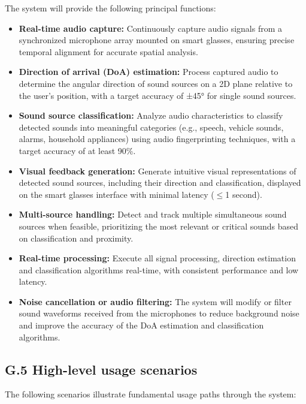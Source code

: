 \documentclass[12pt]{article}
\theoremstyle{definition}
\begin{document}
The system will provide the following principal functions:

\begin{itemize}
\item \textbf{Real-time audio capture:} Continuously capture audio signals from
a synchronized microphone array mounted on smart glasses, ensuring precise
temporal alignment for accurate spatial analysis.

\item \textbf{Direction of arrival (DoA) estimation:} Process captured audio to
determine the angular direction of sound sources on a 2D plane relative to the
user's position, with a target accuracy of ±45° for single sound sources.

\item \textbf{Sound source classification:} Analyze audio characteristics to
classify detected sounds into meaningful categories (e.g., speech, vehicle
sounds, alarms, household appliances) using audio fingerprinting techniques,
with a target accuracy of at least 90\%.

\item \textbf{Visual feedback generation:} Generate intuitive visual
representations of detected sound sources, including their direction and
classification, displayed on the smart glasses interface with minimal latency
($\leq$1 second).

\item \textbf{Multi-source handling:} Detect and track multiple simultaneous
sound sources when feasible, prioritizing the most relevant or critical sounds
based on classification and proximity.

\item \textbf{Real-time processing:} Execute all signal processing, direction
estimation and classification algorithms real-time, with consistent performance
and low latency.

\item \textbf{Noise cancellation or audio filtering:} The system will modify or
filter sound waveforms received from the microphones to reduce background noise
and improve the accuracy of the DoA estimation and classification algorithms.
\end{itemize}

\subsection{G.5 High-level usage scenarios} \label{item: G.5}

The following scenarios illustrate fundamental usage paths through the system:
\end{document}
